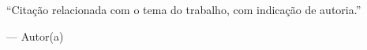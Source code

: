 
\thispagestyle{empty}

\vspace*{\fill}

\begin{flushright}
\begin{minipage}{8cm}

\enquote{Citação relacionada com o tema do trabalho, com indicação de autoria.}

\vspace{0.5cm}

--- Autor(a)

\end{minipage}
\end{flushright}

\newpage